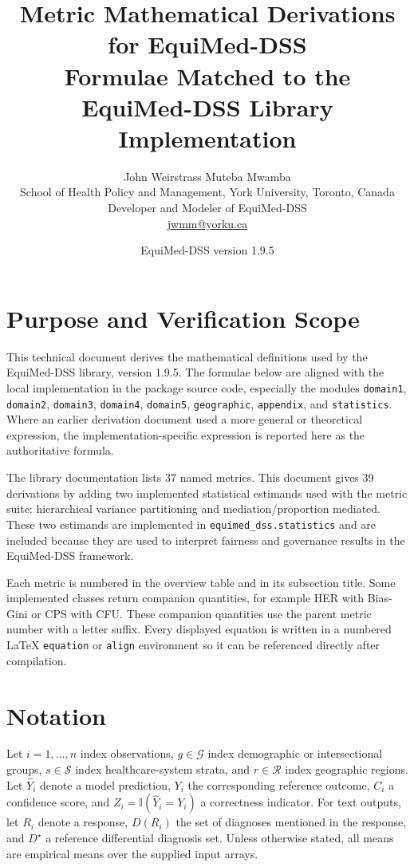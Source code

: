 \documentclass[11pt]{article}
\title{\textbf{Metric Mathematical Derivations for EquiMed-DSS}\\
\large Formulae Matched to the EquiMed-DSS Library Implementation}
\author{John Weirstrass Muteba Mwamba\\
\small School of Health Policy and Management, York University, Toronto, Canada\\
\small Developer and Modeler of EquiMed-DSS\\
\small \href{mailto:jwmm@yorku.ca}{jwmm@yorku.ca}}
\date{EquiMed-DSS version 1.9.5}
\newcommand{\ind}{\mathbb{I}}
\begin{document}
\maketitle

\section*{Purpose and Verification Scope}

This technical document derives the mathematical definitions used by the
EquiMed-DSS library, version 1.9.5. The formulae below are aligned with the
local implementation in the package source code, especially the modules
\texttt{domain1}, \texttt{domain2}, \texttt{domain3}, \texttt{domain4},
\texttt{domain5}, \texttt{geographic}, \texttt{appendix}, and
\texttt{statistics}. Where an earlier derivation document used a more general
or theoretical expression, the implementation-specific expression is reported
here as the authoritative formula.

The library documentation lists 37 named metrics. This document gives 39
derivations by adding two implemented statistical estimands used with the
metric suite: hierarchical variance partitioning and mediation/proportion
mediated. These two estimands are implemented in \texttt{equimed\_dss.statistics}
and are included because they are used to interpret fairness and governance
results in the EquiMed-DSS framework.

Each metric is numbered in the overview table and in its subsection title. Some
implemented classes return companion quantities, for example HER with Bias-Gini
or CPS with CFU. These companion quantities use the parent metric number with a
letter suffix. Every displayed equation is written in a numbered LaTeX
\texttt{equation} or \texttt{align} environment so it can be referenced directly
after compilation.

\section*{Notation}

Let $i=1,\ldots,n$ index observations, $g \in \mathcal{G}$ index demographic or
intersectional groups, $s \in \mathcal{S}$ index healthcare-system strata, and
$r \in \mathcal{R}$ index geographic regions. Let $\hat{Y}_i$ denote a model
prediction, $Y_i$ the corresponding reference outcome, $C_i$ a confidence score,
and $Z_i=\ind(\hat{Y}_i=Y_i)$ a correctness indicator. For text outputs, let
$R_i$ denote a response, $D(R_i)$ the set of diagnoses mentioned in the response,
and $D^\star$ a reference differential diagnosis set. Unless otherwise stated,
all means are empirical means over the supplied input arrays.
\end{document}
